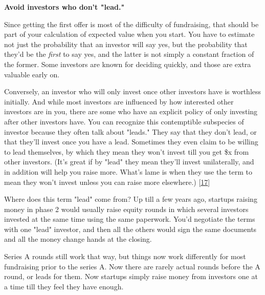                     \textbf{Avoid investors who don't "lead."}

Since
                    getting the first offer is most of the difficulty of
                    fundraising, that should be part of your calculation of
                    expected value when you start. You have to estimate not just
                    the probability that an investor will say yes, but the
                    probability that they'd be the \emph{first} to say yes, and
                    the latter is not simply a constant fraction of the former.
                    Some investors are known for deciding quickly, and those are
                    extra valuable early on.

Conversely, an investor
                    who will only invest once other investors have is worthless
                    initially. And while most investors are influenced by how
                    interested other investors are in you, there are some who
                    have an explicit policy of only investing after other
                    investors have. You can recognize this contemptible
                    subspecies of investor because they often talk about
                    "leads." They say that they don't lead, or that they'll
                    invest once you have a lead. Sometimes they even claim to be
                    willing to lead themselves, by which they mean they won't
                    invest till you get \$x from other investors. (It's great if
                    by "lead" they mean they'll invest unilaterally, and in
                    addition will help you raise more. What's lame is when they
                    use the term to mean they won't invest unless you can raise
                    more elsewhere.)
                    [\href{\#f17n}{17}]

Where does this term "lead" come from? Up till
                    a few years ago, startups raising money in phase 2 would
                    usually raise equity rounds in which several investors
                    invested at the same time using the same paperwork. You'd
                    negotiate the terms with one "lead" investor, and then all
                    the others would sign the same documents and all the money
                    change hands at the closing.

Series A rounds
                    still work that way, but things now work differently for
                    most fundraising prior to the series A. Now there are rarely
                    actual rounds before the A round, or leads for them. Now
                    startups simply raise money from investors one at a time
                    till they feel they have enough.

